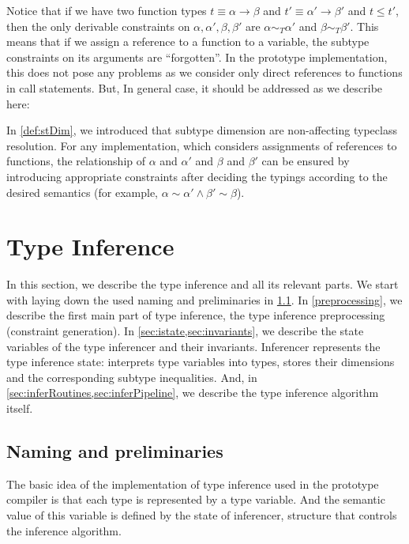 Notice that if we have two function types $t \equiv \alpha \to \beta$ and $t' \equiv \alpha' \to \beta'$ and $t \leq t'$, then the only derivable constraints on $\alpha, \alpha', \beta, \beta'$ are $\alpha \sim_T \alpha'$ and $\beta \sim_T \beta'$. This means that if we assign a reference to a function to a variable, the subtype constraints on its arguments are ``forgotten''. In the prototype implementation, this does not pose any problems as we consider only direct references to functions in call statements. But, In general case, it should be addressed as we describe here:

In \cref{def:stDim}, we introduced that subtype dimension are non-affecting typeclass resolution. For any implementation, which considers assignments of references to functions, the relationship of $\alpha$ and $\alpha'$ and $\beta$ and $\beta'$ can be ensured by introducing appropriate constraints after deciding the typings according to the desired semantics (for example, $\alpha \sim \alpha' \land \beta' \sim \beta$).

\section{Type Inference}
\label{sec:typeInf}

In this section, we describe the type inference and all its relevant parts. We start with laying down the used naming and preliminaries in \cref{sec:namingPrel}. In \cref{preprocessing}, we describe the first main part of type inference, the type inference preprocessing (constraint generation). In \cref{sec:istate,sec:invariants}, we describe the state variables of the type inferencer and their invariants. Inferencer represents the type inference state: interprets type variables into types, stores their dimensions and the corresponding subtype inequalities. And, in \cref{sec:inferRoutines,sec:inferPipeline}, we describe the type inference algorithm itself.

\subsection{Naming and preliminaries}
\label{sec:namingPrel}

The basic idea of the implementation of type inference used in the prototype compiler is that each type is represented by a type variable. And the semantic value of this variable is defined by the state of inferencer, structure that controls the inference algorithm.

